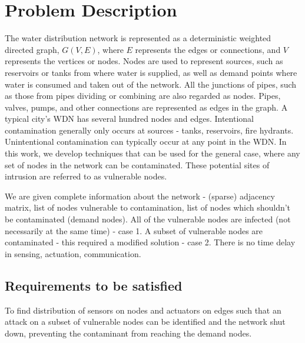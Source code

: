 \documentclass[authoryear,preprint,review,12pt]{elsarticle}
\begin{document}
\section{Problem Description}

The water distribution network is represented as a deterministic weighted directed graph, 
$G(V,E)$, where $E$ represents the edges or connections, and $V$ represents the vertices or 
nodes.
Nodes are used to represent sources, such as reservoirs or tanks from where water is supplied, 
as well as demand points where water is consumed and taken out of the network. 
All the junctions of pipes, such as those from pipes dividing or combining are also regarded as nodes.
Pipes, valves, pumps, and other connections are represented as edges in the graph. 
A typical city's WDN has several hundred nodes and edges.
Intentional contamination generally only occurs at sources - tanks, reservoirs, fire hydrants. 
Unintentional contamination can typically occur at any point in the WDN. 
In this work, we develop techniques that can be used for the general case, where any set of nodes in the network can be contaminated.
These potential sites of intrusion are referred to as vulnerable nodes.

We are given complete information about the network - (sparse) adjacency matrix,
list of nodes vulnerable to contamination,
list of nodes which shouldn't be contaminated (demand nodes).
All of the vulnerable nodes are infected (not necessarily at the same time) - case 1.
A subset of vulnerable nodes are contaminated - this required a modified solution - case 2.
There is no time delay in sensing, actuation, communication.

\subsection{Requirements to be satisfied}
To find distribution of sensors on nodes and actuators on edges such
that an attack on a subset of vulnerable nodes can be identified and
the network shut down, preventing the contaminant
from reaching the demand nodes.
\end{document}
